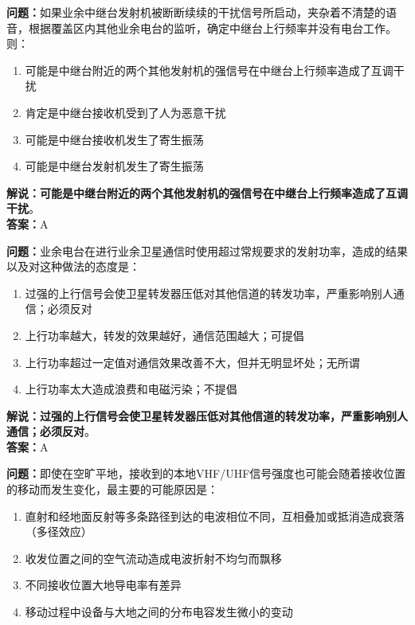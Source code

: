 \textbf{问题：}如果业余中继台发射机被断断续续的干扰信号所启动，夹杂着不清楚的语音，根据覆盖区内其他业余电台的监听，确定中继台上行频率并没有电台工作。则：

\begin{enumerate}[label=\Alph*), leftmargin=1cm]
	\item 可能是中继台附近的两个其他发射机的强信号在中继台上行频率造成了互调干扰
	\item 肯定是中继台接收机受到了人为恶意干扰
	\item 可能是中继台接收机发生了寄生振荡
	\item 可能是中继台发射机发生了寄生振荡
\end{enumerate}

\textbf{解说：可能是中继台附近的两个其他发射机的强信号在中继台上行频率造成了互调干扰}。\\\textbf{答案：}A%


\textbf{问题：}业余电台在进行业余卫星通信时使用超过常规要求的发射功率，造成的结果以及对这种做法的态度是：

\begin{enumerate}[label=\Alph*), leftmargin=1cm]
	\item 过强的上行信号会使卫星转发器压低对其他信道的转发功率，严重影响别人通信；必须反对
	\item 上行功率越大，转发的效果越好，通信范围越大；可提倡
	\item 上行功率超过一定值对通信效果改善不大，但并无明显坏处；无所谓
	\item 上行功率太大造成浪费和电磁污染；不提倡
\end{enumerate}

\textbf{解说：过强的上行信号会使卫星转发器压低对其他信道的转发功率，严重影响别人通信；必须反对}。\\\textbf{答案：}A%


\textbf{问题：}即使在空旷平地，接收到的本地VHF/UHF信号强度也可能会随着接收位置的移动而发生变化，最主要的可能原因是：

\begin{enumerate}[label=\Alph*), leftmargin=1cm]
	\item 直射和经地面反射等多条路径到达的电波相位不同，互相叠加或抵消造成衰落（多径效应）
	\item 收发位置之间的空气流动造成电波折射不均匀而飘移
	\item 不同接收位置大地导电率有差异
	\item 移动过程中设备与大地之间的分布电容发生微小的变动
\end{enumerate}

